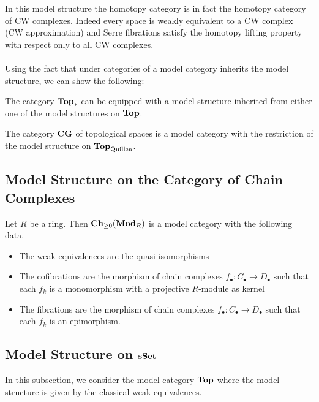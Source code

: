 \documentclass[a4paper]{article}
\begin{document}
In this model structure the homotopy category is in fact the homotopy category of CW complexes. Indeed every space is weakly equivalent to a CW complex (CW approximation) and Serre fibrations satisfy the homotopy lifting property with respect only to all CW complexes. \\~\\

Using the fact that under categories of a model category inherits the model structure, we can show the following: 

\begin{lmm}{}{} The category $\bold{Top}_\ast$ can be equipped with a model structure inherited from either one of the model structures on $\bold{Top}$. 
\end{lmm}

\begin{thm}{}{} The category $\bold{CG}$ of topological spaces is a model category with the restriction of the model structure on $\bold{Top}_\text{Quillen}$. 
\end{thm}


\subsection{Model Structure on the Category of Chain Complexes}
\begin{thm}{}{} Let $R$ be a ring. Then $\bold{Ch}_{\geq 0}(\bold{Mod}_R)$ is a model category with the following data. 
\begin{itemize}
\item The weak equivalences are the quasi-isomorphisms
\item The cofibrations are the morphism of chain complexes $f_\bullet:C_\bullet\to D_\bullet$ such that each $f_k$ is a monomorphism with a projective $R$-module as kernel
\item The fibrations are the morphism of chain complexes $f_\bullet:C_\bullet\to D_\bullet$ such that each $f_k$ is an epimorphism. 
\end{itemize}
\end{thm}

\subsection{Model Structure on $\bold{sSet}$}
In this subsection, we consider the model category $\bold{Top}$ where the model structure is given by the classical weak equivalences. 
\end{document}
